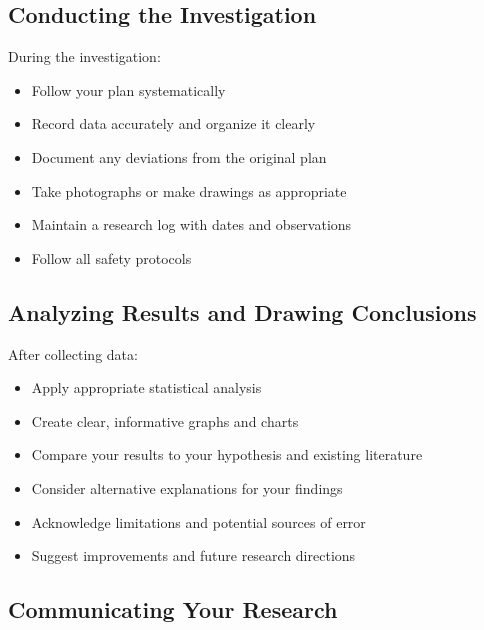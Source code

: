 \subsection{Conducting the Investigation}

During the investigation:
\begin{itemize}
    \item Follow your plan systematically
    \item Record data accurately and organize it clearly
    \item Document any deviations from the original plan
    \item Take photographs or make drawings as appropriate
    \item Maintain a research log with dates and observations
    \item Follow all safety protocols
\end{itemize}

\subsection{Analyzing Results and Drawing Conclusions}

After collecting data:
\begin{itemize}
    \item Apply appropriate statistical analysis
    \item Create clear, informative graphs and charts
    \item Compare your results to your hypothesis and existing literature
    \item Consider alternative explanations for your findings
    \item Acknowledge limitations and potential sources of error
    \item Suggest improvements and future research directions
\end{itemize}

\subsection{Communicating Your Research}

